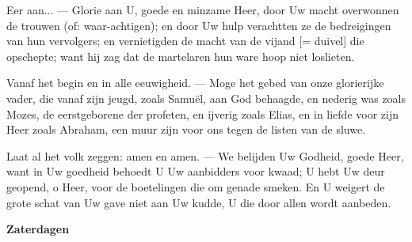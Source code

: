 \documentclass[12pt,twoside,a5paper]{article}
\newlength{\origparskip}
\newenvironment{halfparskip}{
  \setlength{\parskip}{0.5\origparskip}
}{
  \setlength{\parskip}{\origparskip}
}
\newcommand{\liturgicaloption}[1]{{\color{BrickRed}\textbf{#1}}}
\newcommand{\markedday}[1]{%
  \liturgicaloption{#1}%
  \markright{#1}%
}
\begin{document}
\begin{halfparskip}
  Eer aan... --- Glorie aan U, goede en minzame Heer, door Uw macht overwonnen de trouwen (of: waar-achtigen); en door Uw hulp verachtten ze de bedreigingen van hun vervolgers; en vernietigden de macht van de vijand [= duivel] die opschepte; want hij zag dat de martelaren hun ware hoop niet loslieten.

  Vanaf het begin en in alle eeuwigheid. --- Moge het gebed van onze glorierijke vader, die vanaf zijn jeugd, zoals Samuël, aan God behaagde, en nederig was zoals Mozes, de eerstgeborene der profeten, en ijverig zoals Elias, en in liefde voor zijn Heer zoals Abraham, een muur zijn voor ons tegen de listen van de sluwe.

  Laat al het volk zeggen: amen en amen. --- We belijden Uw Godheid, goede Heer, want in Uw goedheid behoedt U Uw aanbidders voor kwaad; U hebt Uw deur geopend, o Heer, voor de boetelingen die om genade smeken. En U weigert de grote schat van Uw gave niet aan Uw kudde, U die door allen wordt aanbeden.
\end{halfparskip}

\markedday{Zaterdagen}
\end{document}

